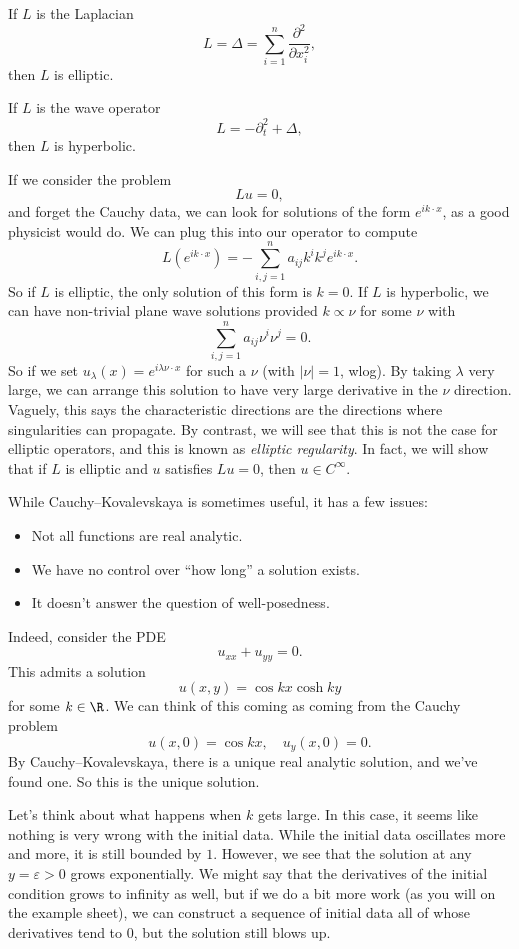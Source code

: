 \documentclass[a4paper]{article}
\begin{document}
\begin{eg}
  If $L$ is the Laplacian
  \[
    L = \Delta = \sum_{i= 1}^n \frac{\partial^2}{\partial x_i^2},
  \]
  then $L$ is elliptic.

  If $L$ is the wave operator
  \[
    L = - \partial_t^2 + \Delta,
  \]
  then $L$ is hyperbolic.
\end{eg}

If we consider the problem
\[
  Lu = 0,
\]
and forget the Cauchy data, we can look for solutions of the form $e^{ik\cdot x}$, as a good physicist would do. We can plug this into our operator to compute
\[
  L(e^{ik\cdot x}) = - \sum_{i, j = 1}^n a_{ij} k^i k^j e^{ik\cdot x}.
\]
So if $L$ is elliptic, the only solution of this form is $k = 0$. If $L$ is hyperbolic, we can have non-trivial plane wave solutions provided $k \propto \nu$ for some $\nu$ with
\[
  \sum_{i, j = 1}^n a_{ij} \nu^i \nu^j = 0.
\]
So if we set $u_\lambda(x) = e^{i\lambda \nu \cdot x}$ for such a $\nu$ (with $|\nu| = 1$, wlog). By taking $\lambda$ very large, we can arrange this solution to have very large derivative in the $\nu$ direction. Vaguely, this says the characteristic directions are the directions where singularities can propagate. By contrast, we will see that this is not the case for elliptic operators, and this is known as \emph{elliptic regularity}. In fact, we will show that if $L$ is elliptic and $u$ satisfies $Lu = 0$, then $u \in C^\infty$.

While Cauchy--Kovalevskaya is sometimes useful, it has a few issues:
\begin{itemize}
  \item Not all functions are real analytic.
  \item We have no control over ``how long'' a solution exists.
  \item It doesn't answer the question of well-posedness.
\end{itemize}

Indeed, consider the PDE
\[
  u_{xx} + u_{yy} = 0.
\]
This admits a solution
\[
  u(x, y) = \cos kx \cosh ky
\]
for some $k \in \R$. We can think of this coming as coming from the Cauchy problem
\[
  u(x, 0) = \cos kx,\quad u_y(x, 0) = 0.
\]
By Cauchy--Kovalevskaya, there is a unique real analytic solution, and we've found one. So this is the unique solution.

Let's think about what happens when $k$ gets large. In this case, it seems like nothing is very wrong with the initial data. While the initial data oscillates more and more, it is still bounded by $1$. However, we see that the solution at any $y = \varepsilon > 0$ grows exponentially. We might say that the derivatives of the initial condition grows to infinity as well, but if we do a bit more work (as you will on the example sheet), we can construct a sequence of initial data all of whose derivatives tend to $0$, but the solution still blows up.
\end{document}
